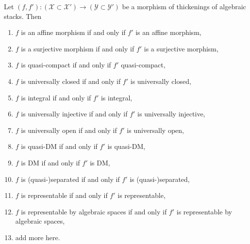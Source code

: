 \begin{lemma}
\label{lemma-thicken-property-morphisms}
Let $(f, f') : (\mathcal{X} \subset \mathcal{X}') \to
(\mathcal{Y} \subset \mathcal{Y}')$
be a morphism of thickenings of algebraic stacks. Then
\begin{enumerate}
\item $f$ is an affine morphism if and only if $f'$ is an affine morphism,
\item $f$ is a surjective morphism if and only if $f'$ is a surjective morphism,
\item $f$ is quasi-compact if and only if $f'$ quasi-compact,
\item $f$ is universally closed if and only if $f'$ is universally closed,
\item $f$ is integral if and only if $f'$ is integral,
\item $f$ is universally injective if and only if $f'$ is universally injective,
\item $f$ is universally open if and only if $f'$ is universally open,
\item $f$ is quasi-DM if and only if $f'$ is quasi-DM,
\item $f$ is DM if and only if $f'$ is DM,
\item $f$ is (quasi-)separated if and only if $f'$ is (quasi-)separated,
\item $f$ is representable if and only if $f'$ is representable,
\item $f$ is representable by algebraic spaces if and only if $f'$ is
representable by algebraic spaces,
\item add more here.
\end{enumerate}
\end{lemma}


